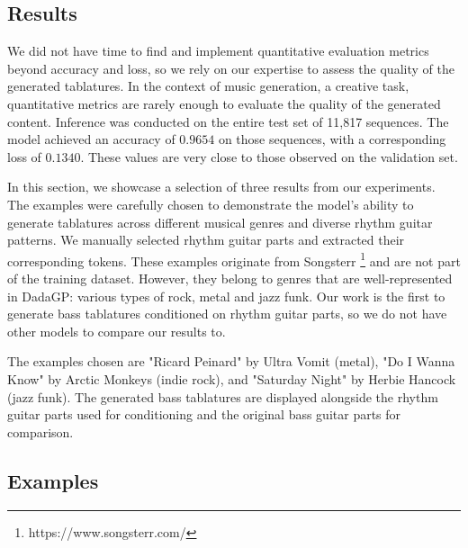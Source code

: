 \subsection{Results}

We did not have time to find and implement quantitative evaluation metrics beyond accuracy and loss, 
so we rely on our expertise to assess the quality of the generated tablatures.
In the context of music generation, a creative task, quantitative metrics are rarely enough to evaluate the quality of the generated content.
Inference was conducted on the entire test set of 11,817 sequences.
The model achieved an accuracy of $0.9654$ on those sequences, with a corresponding loss of $0.1340$.
These values are very close to those observed on the validation set.

In this section, we showcase a selection of three results from our experiments.
The examples were carefully chosen to demonstrate the model's ability to generate tablatures across different musical genres and diverse rhythm guitar patterns.
We manually selected rhythm guitar parts and extracted their corresponding tokens.
These examples originate from Songsterr \footnote{https://www.songsterr.com/} and are not part of the training dataset.
However, they belong to genres that are well-represented in DadaGP: various types of rock, metal and jazz funk.
Our work is the first to generate bass tablatures conditioned on rhythm guitar parts, so we do not have other models to compare our results to.

The examples chosen are "Ricard Peinard" by Ultra Vomit (metal), "Do I Wanna Know" by Arctic Monkeys (indie rock), and "Saturday Night" by Herbie Hancock (jazz funk).
The generated bass tablatures are displayed alongside the rhythm guitar parts used for conditioning and the original bass guitar parts for comparison.

\newpage

\subsection{Examples}



